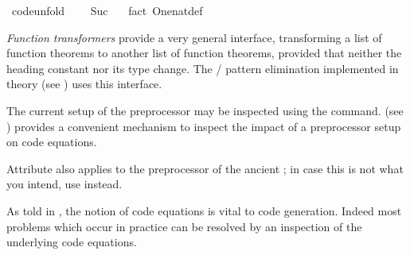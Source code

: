 \begin{isabellebody}
\begin{itemize}
\ {}code{}unfold{}{}\isanewline
\ \ {}{}\ {}\ Suc\ {}{}\ \isamarkupfalse%
\ {}fact\ One{}nat{}def{}%
\endisatagquote
{\isafoldquote}%
%
\isadelimquote
%
\endisadelimquote
%
\end{itemize}
%
\begin{isamarkuptext}%
\noindent \emph{Function transformers} provide a very general
  interface, transforming a list of function theorems to another list
  of function theorems, provided that neither the heading constant nor
  its type change.  The  /  pattern
  elimination implemented in theory \hyperlink{theory.Efficient-Nat}{\mbox{}} (see
  ) uses this interface.

  \noindent The current setup of the preprocessor may be inspected
  using the \hypertarget{command.print-codeproc}{\hyperlink{command.print-codeproc}{\mbox{}}} command.  \hypertarget{command.code-thms}{\hyperlink{command.code-thms}{\mbox{}}} (see ) provides a convenient
  mechanism to inspect the impact of a preprocessor setup on code
  equations.

  \begin{warn}
    Attribute \hyperlink{attribute.code-unfold}{\mbox{}} also applies to the
    preprocessor of the ancient ; in case
    this is not what you intend, use \hyperlink{attribute.code-inline}{\mbox{}} instead.
  \end{warn}%
\end{isamarkuptext}%
\isamarkuptrue%
%
\isamarkuptrue%
%
\begin{isamarkuptext}%
As told in , the notion of code equations is
  vital to code generation.  Indeed most problems which occur in
  practice can be resolved by an inspection of the underlying code
  equations.


\end{isamarkuptext}
\end{isabellebody}
